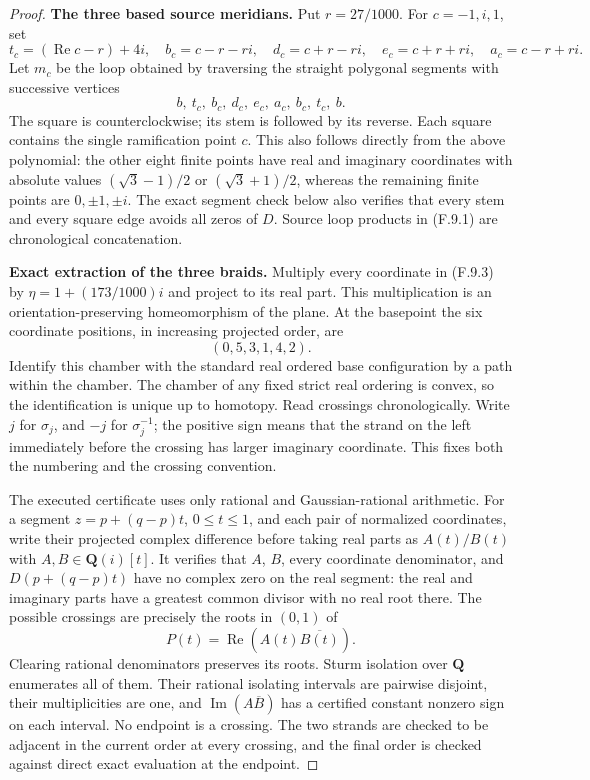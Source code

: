 \begin{proof}
\textbf{The three based source meridians.}
Put $r=27/1000$.  For $c=-1,i,1$, set
\[
 t_c=(\operatorname{Re}c-r)+4i,
 \quad b_c=c-r-ri,
 \quad d_c=c+r-ri,
 \quad e_c=c+r+ri,
 \quad a_c=c-r+ri.
\]
Let $m_c$ be the loop obtained by traversing the
straight polygonal segments with successive vertices
\[
 b,\ t_c,\ b_c,\ d_c,\ e_c,\ a_c,\ b_c,\ t_c,\ b.
                                                               \tag{F.9.5}
\]
The square is counterclockwise; its stem is followed
by its reverse.  Each square contains the single
ramification point $c$.  This also follows directly
from the above polynomial: the other eight finite
points have real and imaginary coordinates with
absolute values $(\sqrt3-1)/2$ or $(\sqrt3+1)/2$,
whereas the remaining finite points are
$0,\pm1,\pm i$.
The exact segment check below also verifies that every
stem and every square edge avoids all zeros of $D$.
Source loop products in (F.9.1) are chronological
concatenation.

\textbf{Exact extraction of the three braids.}
Multiply every coordinate in (F.9.3) by
$\eta=1+(173/1000)i$ and project to its real part.
This multiplication is an orientation-preserving
homeomorphism of the plane.  At the basepoint the
six coordinate positions, in increasing projected
order, are
\[
                      (0,5,3,1,4,2).
\]
Identify this chamber with the standard real ordered
base configuration by a path within the chamber.
The chamber of any fixed strict real ordering is
convex, so the identification is unique up to
homotopy.  Read crossings chronologically.  Write
$j$ for $\sigma_j$, and $-j$ for $\sigma_j^{-1}$;
the positive sign means that the strand on the left
immediately before the crossing has larger imaginary
coordinate.  This fixes both the numbering and the
crossing convention.

The executed certificate
uses only rational and Gaussian-rational arithmetic.
For a segment $z=p+(q-p)t$, $0\le t\le1$, and each
pair of normalized coordinates, write their projected
complex difference before taking real parts as
$A(t)/B(t)$ with $A,B\in\mathbf Q(i)[t]$.
It verifies that $A$, $B$, every coordinate denominator,
and $D(p+(q-p)t)$ have no complex zero on the real
segment: the real and imaginary parts have a greatest
common divisor with no real root there.
The possible crossings are precisely the roots in
$(0,1)$ of
\[
       P(t)=\operatorname{Re}(A(t)\overline{B(t)}).
                                                               \tag{F.9.6}
\]
Clearing rational denominators preserves its roots.
Sturm isolation over $\mathbf Q$ enumerates all of
them.  Their rational isolating intervals are pairwise
disjoint, their multiplicities are one, and
$\operatorname{Im}(A\overline B)$ has a certified
constant nonzero sign on each interval.  No endpoint
is a crossing.  The two strands are checked to be
adjacent in the current order at every crossing,
and the final order is checked against direct exact
evaluation at the endpoint.


\end{proof}
